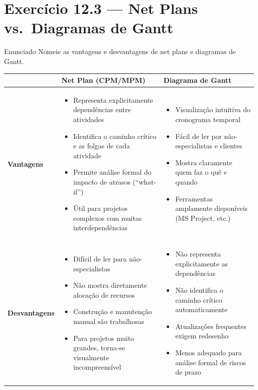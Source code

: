 \documentclass[12pt,a4paper]{article}
\begin{document}
\section*{Exercício 12.3 — Net Plans vs.\ Diagramas de Gantt}

\begin{questao}{Enunciado}
Nomeie as vantagens e desvantagens de net plans e diagramas de Gantt.
\end{questao}
\begin{resposta}
\begin{center}
\begin{tabular}{p{3cm}p{5.5cm}p{5.5cm}}
\toprule
 & \textbf{Net Plan (CPM/MPM)} & \textbf{Diagrama de Gantt} \\
\midrule
\textbf{Vantagens}
& \begin{itemize}[nosep,leftmargin=*]
    \item Representa explicitamente dependências entre atividades
    \item Identifica o caminho crítico e as folgas de cada atividade
    \item Permite análise formal do impacto de atrasos (``what-if'')
    \item Útil para projetos complexos com muitas interdependências
  \end{itemize}
& \begin{itemize}[nosep,leftmargin=*]
    \item Visualização intuitiva do cronograma temporal
    \item Fácil de ler por não-especialistas e clientes
    \item Mostra claramente quem faz o quê e quando
    \item Ferramentas amplamente disponíveis (MS Project, etc.)
  \end{itemize} \\
\midrule
\textbf{Desvantagens}
& \begin{itemize}[nosep,leftmargin=*]
    \item Difícil de ler para não-especialistas
    \item Não mostra diretamente alocação de recursos
    \item Construção e manutenção manual são trabalhosas
    \item Para projetos muito grandes, torna-se visualmente incompreensível
  \end{itemize}
& \begin{itemize}[nosep,leftmargin=*]
    \item Não representa explicitamente as dependências
    \item Não identifica o caminho crítico automaticamente
    \item Atualizações frequentes exigem redesenho
    \item Menos adequado para análise formal de riscos de prazo
  \end{itemize} \\
\bottomrule
\end{tabular}
\end{center}


\end{resposta}
\end{document}
